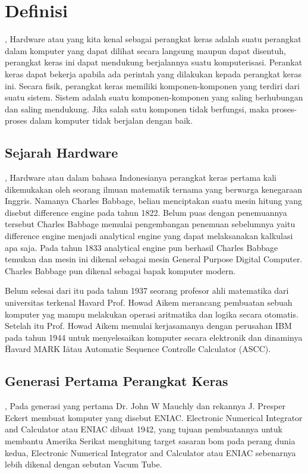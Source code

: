 
\section{Definisi},
Hardware atau yang kita kenal sebagai perangkat keras adalah suatu perangkat dalam komputer yang dapat dilihat secara langsung maupun dapat
disentuh, perangkat keras ini dapat mendukung berjalannya suatu komputerisasi. Perankat keras dapat bekerja apabila ada perintah yang
dilakukan kepada perangkat keras ini. Secara fisik, perangkat keras memiliki komponen-komponen yang terdiri dari suatu sistem. Sistem
adalah suatu komponen-komponen yang saling berhubungan dan saling mendukung. Jika salah satu komponen tidak berfungsi, maka proses-
proses dalam komputer tidak berjalan dengan baik.

\subsection{Sejarah Hardware},
Hardware atau dalam bahasa Indonesianya perangkat keras pertama kali dikemukakan oleh seorang ilmuan matematik ternama yang berwarga
kenegaraan Inggris. Namanya Charles Babbage, beliau menciptakan suatu mesin hitung yang disebut difference engine pada tahun 1822.
Belum puas dengan penemuannya tersebut Charles Babbage memulai pengembangan penemuan sebelumnya yaitu difference engine menjadi
analytical engine yang dapat melaksanakan kalkulasi apa saja. Pada tahun 1833 analytical engine pun berhasil Charles Babbage temukan
dan mesin ini dikenal sebagai mesin General Purpose Digital Computer. Charles Babbage pun dikenal sebagai bapak komputer modern.

Belum selesai dari itu pada tahun 1937 seorang profesor ahli matematika dari universitas terkenal Havard Prof. Howad Aikem merancang
pembuatan sebuah komputer yag mampu melakukan operasi aritmatika dan logika secara otomatis. Setelah itu Prof. Howad Aikem memulai
kerjasamanya dengan perusahan IBM pada tahun 1944 untuk menyelesaikan komputer secara elektronik dan dinaminya \"Havard MARK I\" atau
Automatic Sequence Controlle Calculator (ASCC).

\subsection{Generasi Pertama Perangkat Keras},
Pada generasi yang pertama Dr. John W Mauchly dan rekannya J. Presper Eckert membuat komputer yang disebut ENIAC. Electronic Numerical
Integrator and Calculator atau ENIAC dibuat 1942, yang tujuan pembuatannya untuk membantu Amerika Serikat menghitung target sasaran
bom pada perang dunia kedua, Electronic Numerical Integrator and Calculator atau ENIAC sebenarnya lebih dikenal dengan sebutan Vacum
Tube.

